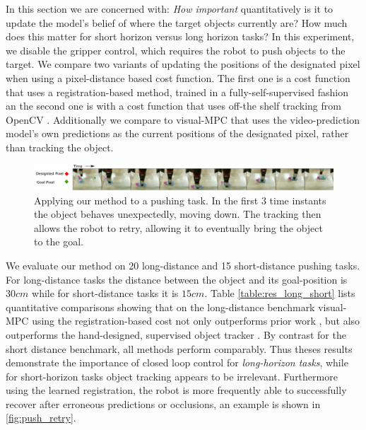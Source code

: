 In this section we are concerned with: \emph{How important} quantitatively is it to update the model's belief of where the target objects currently are? How much does this matter for short horizon versus long horizon tasks?
In this experiment, we disable the gripper control, which requires the robot to push objects to the target. We compare two variants of updating the positions of the designated pixel when using a pixel-distance based cost function. The first one is a cost function that uses a registration-based method, trained in a fully-self-supervised fashion an the second one is with a cost function that uses off-the shelf tracking from OpenCV \cite{babenko2009visual}. Additionally we compare to visual-MPC that uses the video-prediction model's own predictions as the current positions of the designated pixel, rather than tracking the object.



\begin{figure}
    \centering    \includegraphics[width=1.0\textwidth]{images_rfr/push_correction.pdf}
    \caption{\small{Applying our method to a pushing task. In the first 3 time instants the object behaves unexpectedly, moving down. The tracking then allows the robot to retry, allowing it to eventually bring the object to the goal.}}
    \label{fig:push_retry}
\end{figure}


We evaluate our method on 20 long-distance and 15 short-distance pushing tasks. For long-distance tasks the distance between the object and its goal-position is $30cm$ while for short-distance tasks it is $15cm$. Table \ref{table:res_long_short} lists quantitative comparisons showing that on the long-distance benchmark visual-MPC using the registration-based cost not only outperforms prior work \cite{sna}, but also outperforms the hand-designed, supervised object tracker \cite{babenko2009visual}. By contrast for the short distance benchmark, all methods perform comparably. Thus theses results demonstrate the importance of closed loop control for \emph{long-horizon tasks}, while for short-horizon tasks object tracking appears to be irrelevant. Furthermore using the learned registration, the robot is more frequently able to successfully recover after erroneous predictions or occlusions, an example is shown in \autoref{fig:push_retry}.

